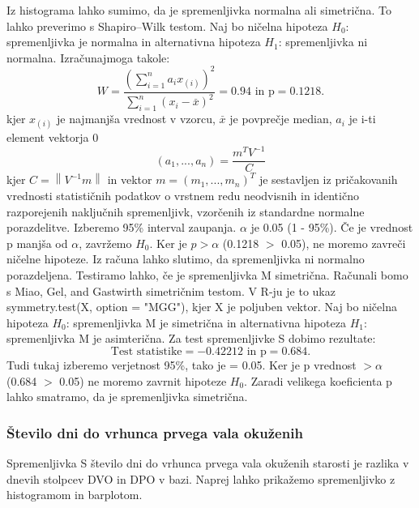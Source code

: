 \documentclass[a4paper,11pt]{article}
\begin{document}
Iz histograma lahko sumimo, da je spremenljivka normalna ali simetrična. To lahko preverimo s Shapiro–Wilk testom. Naj bo ničelna hipoteza \(H_0\): spremenljivka je normalna in alternativna hipoteza \(H_1\): spremenljivka ni normalna. Izračunajmoga takole:
\[W = \frac{(\sum_{i = 1}^{n}a_i x_{(i)})^2}{\sum_{i = 1}^{n}(x_i - \overset{\_}{x})^2} = 0.94 \text{ in p} = 0.1218.\]
kjer \(x_{(i)}\) je najmanjša vrednost v vzorcu, \(\overset{\_}{x}\) je povprečje median, \(a_i\) je i-ti element vektorja 0   
\[(a_1,...,a_n) = \frac{m^T V^{-1}}{C}\]
kjer \( C = \left\| V^{-1}m \right\|\) in vektor \(m = (m_1,...,m_n)^T\) je sestavljen iz pričakovanih vrednosti statističnih podatkov o vrstnem redu neodvisnih in identično razporejenih naključnih spremenljivk, vzorčenih iz standardne normalne porazdelitve.
Izberemo 95\% interval zaupanja. \(\alpha\) je 0.05 (1 - 95\%). Če je vrednost p manjša od \(\alpha\), zavržemo \(H_0\). Ker je \(p > \alpha\) (0.1218 \(>\) 0.05), ne moremo zavreči ničelne hipoteze. Iz računa lahko slutimo, da spremenljivka ni normalno porazdeljena. Testiramo lahko, če je spremenljivka M simetrična. Računali bomo s Miao, Gel, and Gastwirth simetričnim testom. V R-ju je to ukaz symmetry.test(X, option = "MGG")\cite{lawstat}, kjer X je poljuben vektor. Naj bo ničelna hipoteza \(H_0\): spremenljivka M je simetrična in alternativna hipoteza \(H_1\): spremenljivka M je asimterična. Za test spremenljivke S dobimo rezultate:
\[\text{Test statistike} = -0.42212 \text{ in p} = 0.684.\]
Tudi tukaj izberemo verjetnost 95\%, tako je \alpha = 0.05. Ker je p vrednost \(> \alpha\) (0.684 \(>\) 0.05) ne moremo zavrnit hipoteze \(H_0\). Zaradi velikega koeficienta p lahko smatramo, da je spremenljivka simetrična.

\subsubsection{Število dni do vrhunca prvega vala okuženih}
Spremenljivka S število dni do vrhunca prvega vala okuženih starosti je razlika v dnevih stolpcev DVO in DPO v bazi. Naprej lahko prikažemo spremenljivko z histogramom in barplotom.
\end{document}
